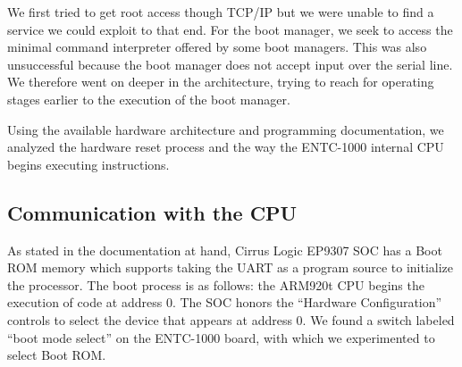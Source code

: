 \documentclass[conference]{IEEEtran}
\newcommand{\nota}[1]{}
\begin{document}
We first tried to get root access though TCP/IP but we were unable
to find a service we could exploit to that end.
For the boot manager, we seek to access the minimal command
interpreter offered by some boot managers.
This was also unsuccessful because the boot manager does not accept 
input over the serial line.
We therefore went on deeper in the architecture, trying to reach for operating
stages earlier to the execution of the boot manager.


\nota {
Leyendo la documentación obtenida de la arquitectura y programación del hardware,
se analizó el proceso de reinicio del hardware y como la CPU interna
del ENTC-1000 comienza a ejecutar instrucciones.
}

Using the available hardware architecture and programming documentation,
we analyzed the hardware reset process and the way the ENTC-1000
internal CPU begins executing instructions.

\subsection*{Communication with the CPU}

\nota{El SOC Cirrus EP9307 tiene una ROM de arranque\footnote{boot ROM}.
En un reinicio (en inglés reset) del SOC, la CPU (ARM920t) comienza a ejecutar código en la dirección cero.}

As stated in the documentation at hand, Cirrus Logic EP9307 SOC has a Boot ROM memory which supports taking the UART as a program source to initialize the processor. The boot process is as follows: the ARM920t CPU begins the execution of code at address 0. The SOC honors the ``Hardware Configuration'' controls to select the device that appears at address 0. We found a switch labeled ``boot mode select'' on the ENTC-1000 board, with which we experimented to select Boot ROM.

\nota{Por otro lado, el manual del SOC indica que éste utiliza los controles de la ``configuración del hardware'' para seleccionar qué dispositivo aparece en la dirección ``cero''. Al observar la placa ENTC-1000, se identificó un interruptor etiquetado como ``boot mode select''. Por lo que se procedió a experimentar con el mismo, con el objetivo de seleccionar el Boot ROM y así mapearlo a la dirección cero, y por ende, lograr su ejecución. }
\end{document}
